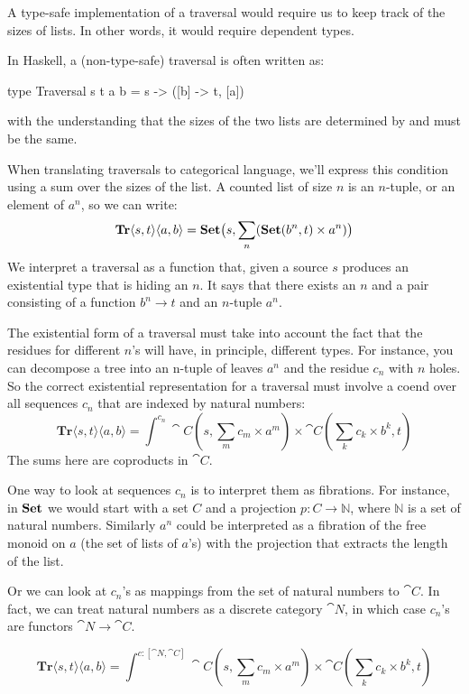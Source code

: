 \documentclass[DaoFP]{subfiles}
\begin{document}
A type-safe implementation of a traversal would require us to keep track of the sizes of lists. In other words, it would require dependent types.

In Haskell, a (non-type-safe) traversal is often written as:
\begin{haskell}
type Traversal s t a b = s -> ([b] -> t, [a])
\end{haskell}
with the understanding that the sizes of the two lists are determined by  and must be the same. 

When translating traversals to categorical language, we'll express this condition using a sum over the sizes of the list. A counted list of size $n$ is an $n$-tuple, or an element of $a^n$, so we can write:
\[ \mathbf{Tr} \langle s, t\rangle \langle a, b \rangle = \mathbf{Set} \big( s, \sum_n (\mathbf{Set} (b^n, t) \times a^n) \big) \]
We interpret a traversal as a function that, given a source $s$ produces an existential type that is hiding an $n$. It says that there exists an $n$ and a pair consisting of a function $b^n \to t$ and an $n$-tuple $a^n$. 

The existential form of a traversal must take into account the fact that the residues for different $n$'s will have, in principle, different types. For instance, you can decompose a tree into an n-tuple of leaves $a^n$ and the residue $c_n$ with $n$ holes. So the correct existential representation for a traversal must involve a coend over all sequences $c_n$ that are indexed by natural numbers:
\[ \mathbf{Tr} \langle s, t\rangle \langle a, b \rangle = \int^{c_n} \cat C (s, \sum_m c_m \times a^m) \times \cat C (\sum_k c_k \times b^k, t) \]
The sums here are coproducts in $\cat C$.

One way to look at sequences $c_n$ is to interpret them as fibrations. For instance, in $\mathbf{Set}$ we would start with a set $C$ and a projection $p \colon C \to \mathbb N$, where $\mathbb N$ is a set of natural numbers. Similarly $a^n$ could be interpreted as a fibration of the free monoid on $a$ (the set of lists of $a$'s) with the projection that extracts the length of the list.

Or we can look at $c_n$'s as mappings from the set of natural numbers to $\cat C$. In fact, we can treat natural numbers as a discrete category $\cat N$, in which case $c_n$'s are functors $\cat N \to \cat C$.

\[ \mathbf{Tr} \langle s, t\rangle \langle a, b \rangle = \int^{c \colon [\cat N, \cat C]} \cat C (s, \sum_m c_m \times a^m) \times \cat C (\sum_k c_k \times b^k, t) \]
\end{document}
